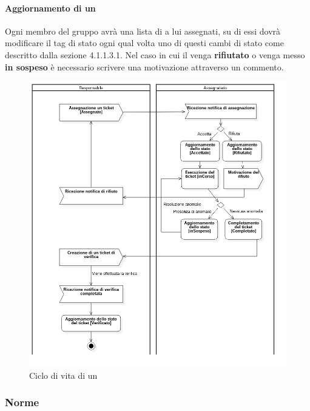 	\paragraph{Aggiornamento di un }
	Ogni membro del gruppo avrà una lista di  a lui assegnati, su di essi dovrà modificare il tag di stato ogni qual volta uno di questi cambi di stato come descritto dalla sezione 4.1.1.3.1. Nel caso in cui il  venga \textbf{rifiutato} o venga messo \textbf{in sospeso} è necessario scrivere una motivazione attraverso un commento.
	\begin{figure}
		\includegraphics[scale=.53]{img/vitaTicket.png}
		\centering
		\caption{Ciclo di vita di un }
	\end{figure}
\subsubsection{Norme}
